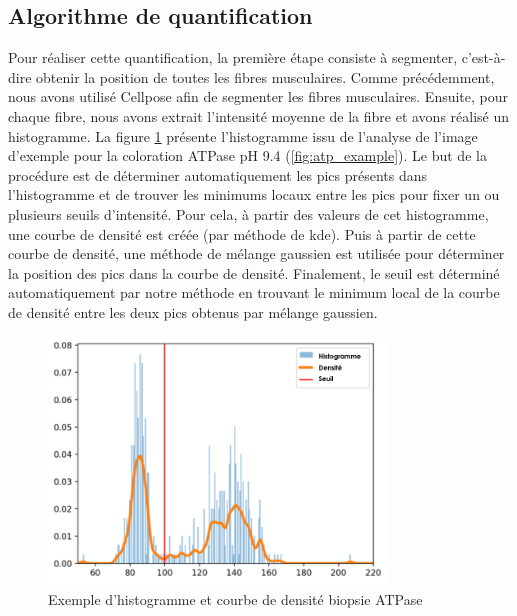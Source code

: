 \subsection{Algorithme de quantification}
Pour réaliser cette quantification, la première étape consiste à segmenter, c'est-à-dire obtenir la position de toutes les fibres musculaires. Comme précédemment, nous avons utilisé Cellpose afin de segmenter les fibres musculaires. Ensuite, pour chaque fibre, nous avons extrait l'intensité moyenne de la fibre et avons réalisé un histogramme. La figure \ref{fig:atp_density} présente l'histogramme issu de l'analyse de l'image d'exemple pour la coloration ATPase pH 9.4 (\ref{fig:atp_example}). Le but de la procédure est de déterminer automatiquement les pics présents dans l'histogramme et de trouver les minimums locaux entre les pics pour fixer un ou plusieurs seuils d'intensité. Pour cela, à partir des valeurs de cet histogramme, une courbe de densité est créée (par méthode de \gls{kde}). Puis à partir de cette courbe de densité, une méthode de mélange gaussien est utilisée pour déterminer la position des pics dans la courbe de densité. Finalement, le seuil est déterminé automatiquement par notre méthode en trouvant le minimum local de la courbe de densité entre les deux pics obtenus par mélange gaussien.
\begin{figure}[!ht]
 \centering
 \includegraphics[width=0.8\textwidth]{figures/density_plot.png}
 \caption[Exemple d'histogramme et courbe de densité biopsie ATPase]{Exemple d'histogramme et courbe de densité biopsie ATPase}
 \label{fig:atp_density}
\end{figure}

